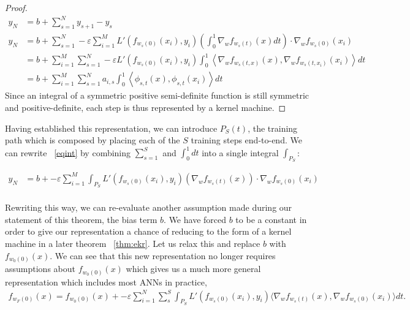 \begin{proof}
\begin{align*}
y_N &= b + \sum_{s=1}^N y_{s+1} - y_s\\
y_N &= b + \sum_{s = 1}^N -\varepsilon \sum_{i = 1}^{M} L'(f_{w_s(0)}(x_i),  y_i)
      \left(\int_0^1\nabla_w f_{w_s(t)}(x)dt\right) \cdot \nabla_w
      f_{w_s(0)}(x_i)\\   \label{eqint}
&= b + \sum_{i = 1}^{M}\sum_{s = 1}^N -\varepsilon  L'(f_{w_s(0)}(x_i),  y_i)  \int_0^1\left\langle \nabla_w f_{w_s(t,x)}(x), \nabla_w f_{w_s(t,x_i)}(x_i) \right\rangle dt\\ 
&= b + \sum_{i = 1}^{M}\sum_{s = 1}^N a_{i, s}  \int_0^1 \left\langle \phi_{s,t}(x), \phi_{s,t}(x_i)\right\rangle dt
\end{align*}
Since an integral of a symmetric positive semi-definite function is still symmetric and positive-definite, each step is thus represented by a kernel machine. 

\end{proof}

Having established this representation, we can introduce $P_S(t)$, the
training path which is composed by placing each of the $S$ training
steps end-to-end. We can rewrite ~\ref{eqint} by combining $\sum_{s =
  1}^S$ and $\int_0^1 dt$ into a single integral $\int_{P_S}$:

\begin{align}
y_N &= b +  -\varepsilon \sum_{i = 1}^{M} \int_{P_S} 
      L'(f_{w_s(0)}(x_i),  y_i)
      \left(\nabla_w f_{w_s(t)}(x)\right) \cdot \nabla_w
      f_{w_s(0)}(x_i)\\   \label{eqint}
\end{align}

Rewriting this way, we can re-evaluate another assumption made during
our statement of this theorem, the bias term $b$. We have forced $b$
to be a constant in order to give our representation a chance of
reducing to the form of a kernel machine in a later theorem
~\ref{thm:ekr}. Let us relax this and replace $b$ with
$f_{w_0(0)}(x)$. We can see that this new representation no longer
requires assumptions about $f_{w_0(0)}(x)$ which gives us a much more
general representation which includes most ANNs in practice, 
\begin{align}
f_{w_F(0)}(x) = f_{w_0(0)}(x) +  -\varepsilon \sum_{i=1}^N \sum_s^S \int_{P_S} L'(f_{w_s(0)}(x_i),  y_i)
      \langle\nabla_w f_{w_s(t)}(x), \nabla_w
      f_{w_s(0)}(x_i)\rangle dt \label{eqint}.
\end{align}

